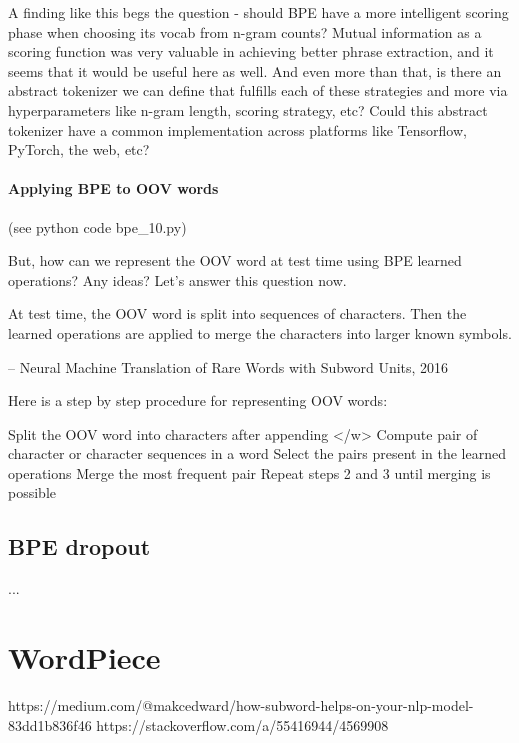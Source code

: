 A finding like this begs the question - should BPE have a more intelligent scoring phase when choosing its vocab from n-gram counts? Mutual information as a scoring function was very valuable in achieving better phrase extraction, and it seems that it would be useful here as well. And even more than that, is there an abstract tokenizer we can define that fulfills each of these strategies and more via hyperparameters like n-gram length, scoring strategy, etc? Could this abstract tokenizer have a common implementation across platforms like Tensorflow, PyTorch, the web, etc?

\paragraph{Applying BPE to OOV words}

(see python code bpe\_10.py)

But, how can we represent the OOV word at test time using BPE learned operations? Any ideas? Let’s answer this question now.

    At test time, the OOV word is split into sequences of characters. Then the learned operations are applied to merge the characters into larger known symbols.

    – Neural Machine Translation of Rare Words with Subword Units, 2016

Here is a step by step procedure for representing OOV words:

    Split the OOV word into characters after appending </w>
    Compute pair of character or character sequences in a word
    Select the pairs present in the learned operations
    Merge the most frequent pair
    Repeat steps 2 and 3 until merging is possible

\subsection{BPE dropout}

...

\section{WordPiece}

https://medium.com/@makcedward/how-subword-helps-on-your-nlp-model-83dd1b836f46
https://stackoverflow.com/a/55416944/4569908


